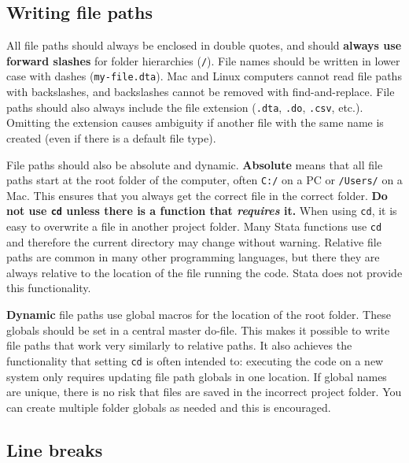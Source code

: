 
\subsection{Writing file paths}

All file paths should always be enclosed in double quotes,
and should \textbf{always use forward slashes} for folder hierarchies (\texttt{/}).
File names should be written in lower case with dashes (\texttt{my-file.dta}).
Mac and Linux computers cannot read file paths with backslashes,
and backslashes cannot be removed with find-and-replace.
File paths should also always include the file extension
(\texttt{.dta}, \texttt{.do}, \texttt{.csv}, etc.).
Omitting the extension causes ambiguity
if another file with the same name is created
(even if there is a default file type).

File paths should also be absolute and dynamic. \textbf{Absolute} means that all
file paths start at the root folder of the computer,
often \texttt{C:/} on a PC or \texttt{/Users/} on a Mac.
This ensures that you always get the correct file in the correct folder.
\textbf{Do not use \texttt{cd} unless there is a function that \textit{requires} it.}
When using \texttt{cd}, it is easy to overwrite a file in another project folder.
Many Stata functions use \texttt{cd} and therefore the current directory may change without warning.
Relative file paths are common in many other programming languages,
but there they are always relative to the location of the file running the code.
Stata does not provide this functionality.

\textbf{Dynamic} file paths use global macros for the location of the root folder.
These globals should be set in a central master do-file.
This makes it possible to write file paths that work very similarly to relative paths.
It also achieves the functionality that setting \texttt{cd} is often intended to:
executing the code on a new system only requires updating file path globals in one location.
If global names are unique, there is no risk that files are saved in the incorrect project folder.
You can create multiple folder globals as needed and this is encouraged.


\subsection{Line breaks}

